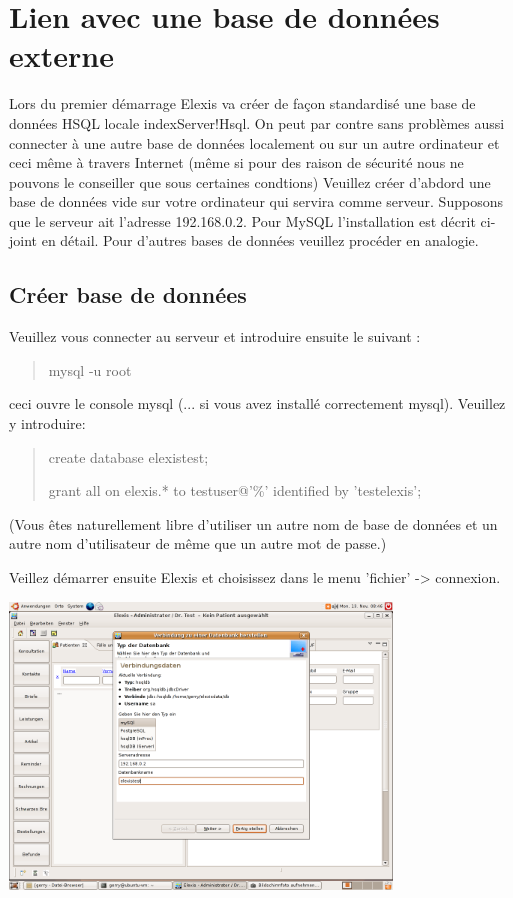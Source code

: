 \section{Lien avec une base de données externe}
Lors du premier démarrage Elexis va créer de façon standardisé une base de données HSQL locale index{Server!Hsql}. On peut par contre sans problèmes aussi connecter à une autre base de données localement ou sur un autre ordinateur et ceci même à travers Internet (même si pour des raison de sécurité nous ne pouvons le conseiller que sous certaines condtions) 
Veuillez créer d'abdord une base de données vide sur votre ordinateur qui servira comme serveur. Supposons que le serveur ait l'adresse 192.168.0.2. Pour MySQL l'installation est décrit ci-joint en détail. Pour d'autres bases de données veuillez procéder en analogie.

\subsection{Créer base de données}
Veuillez vous connecter au serveur et introduire ensuite le suivant :

\begin{quote}
mysql -u root
\end{quote}

ceci ouvre le console mysql (... si vous avez installé correctement mysql).
Veuillez y introduire:

\begin{quote}
create database elexistest;

grant all on elexis.* to testuser@'\%' identified by 'testelexis';
\end{quote}

(Vous êtes naturellement libre d'utiliser un autre nom de base de données et un autre nom d'utilisateur de même que un autre mot de passe.)

Veillez démarrer ensuite Elexis et choisissez dans le menu 'fichier' -> connexion.

\includegraphics[width=4in]{images/verbindung11.png}



